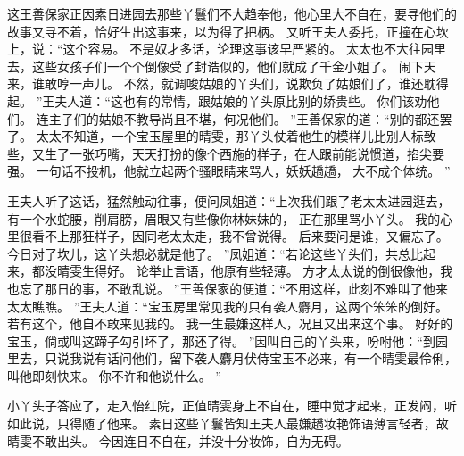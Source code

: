 这王善保家正因素日进园去那些丫鬟们不大趋奉他，他心里大不自在，要寻他们的故事又寻不着，恰好生出这事来，以为得了把柄。
又听王夫人委托，正撞在心坎上，说：“这个容易。
不是奴才多话，论理这事该早严紧的。
太太也不大往园里去，这些女孩子们一个个倒像受了封诰似的，他们就成了千金小姐了。
闹下天来，谁敢哼一声儿。
不然，就调唆姑娘的丫头们，说欺负了姑娘们了，谁还耽得起。
”王夫人道：“这也有的常情，跟姑娘的丫头原比别的娇贵些。
你们该劝他们。
连主子们的姑娘不教导尚且不堪，何况他们。
”王善保家的道：“别的都还罢了。
太太不知道，一个宝玉屋里的晴雯，那丫头仗着他生的模样儿比别人标致些，又生了一张巧嘴，天天打扮的像个西施的样子，在人跟前能说惯道，掐尖要强。
一句话不投机，他就立起两个骚眼睛来骂人，妖妖趫趫，
大不成个体统。
”\par
王夫人听了这话，猛然触动往事，便问凤姐道：“上次我们跟了老太太进园逛去，有一个水蛇腰，削肩膀，眉眼又有些像你林妹妹的，
正在那里骂小丫头。
我的心里很看不上那狂样子，因同老太太走，我不曾说得。
后来要问是谁，又偏忘了。
今日对了坎儿，这丫头想必就是他了。
”凤姐道：“若论这些丫头们，共总比起来，都没晴雯生得好。
论举止言语，他原有些轻薄。
方才太太说的倒很像他，我也忘了那日的事，不敢乱说。
”王善保家的便道：“不用这样，此刻不难叫了他来太太瞧瞧。
”王夫人道：“宝玉房里常见我的只有袭人麝月，这两个笨笨的倒好。
若有这个，他自不敢来见我的。
我一生最嫌这样人，况且又出来这个事。
好好的宝玉，倘或叫这蹄子勾引坏了，那还了得。
”因叫自己的丫头来，吩咐他：“到园里去，只说我说有话问他们，留下袭人麝月伏侍宝玉不必来，有一个晴雯最伶俐，叫他即刻快来。
你不许和他说什么。
”\par
小丫头子答应了，走入怡红院，正值晴雯身上不自在，睡中觉才起来，正发闷，听如此说，只得随了他来。
素日这些丫鬟皆知王夫人最嫌趫妆艳饰语薄言轻者，故晴雯不敢出头。
今因连日不自在，并没十分妆饰，自为无碍。
